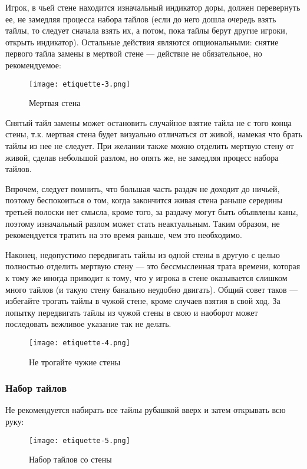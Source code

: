 Игрок, в чьей стене находится изначальный индикатор доры, должен перевернуть ее, не замедляя процесса набора тайлов (если до него дошла очередь взять тайлы, то следует сначала взять их, а потом, пока тайлы берут другие игроки, открыть индикатор). Остальные действия являются опциональными: снятие первого тайла замены в мертвой стене --- действие не обязательное, но рекомендуемое:

\begin{figure}[H]
	\centering
	\texttt{[image: etiquette-3.png]}
	\caption{Мертвая стена}
\end{figure}

Снятый тайл замены может остановить случайное взятие тайла не с того конца стены, т.к. мертвая стена будет визуально отличаться от живой, намекая что брать тайлы из нее не следует. При желании также можно отделить мертвую стену от живой, сделав небольшой разлом, но опять же, не замедляя процесс набора тайлов.

Впрочем, следует помнить, что большая часть раздач не доходит до ничьей, поэтому беспокоиться о том, когда закончится живая стена раньше середины третьей полоски нет смысла, кроме того, за раздачу могут быть объявлены каны, поэтому изначальный разлом может стать неактуальным. Таким образом, не рекомендуется тратить на это время раньше, чем это необходимо.

Наконец, недопустимо передвигать тайлы из одной стены в другую с целью полностью отделить мертвую стену --- это бессмысленная трата времени, которая к тому же иногда приводит к тому, что у игрока в стене оказывается слишком много тайлов (и такую стену банально неудобно двигать). Общий совет таков --- избегайте трогать тайлы в чужой стене, кроме случаев взятия в свой ход. За попытку передвигать тайлы из чужой стены в свою и наоборот может последовать вежливое указание так не делать.

\begin{figure}[H]
	\centering
	\texttt{[image: etiquette-4.png]}
	\caption{Не трогайте чужие стены}
\end{figure}

\subsubsection{Набор тайлов}

Не рекомендуется набирать все тайлы рубашкой вверх и затем открывать всю руку:

\begin{figure}[H]
	\centering
	\texttt{[image: etiquette-5.png]}
	\caption{Набор тайлов со стены}
\end{figure}

